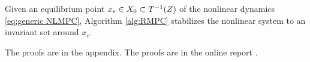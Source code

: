 
\begin{theorem}[Stability]
	\label{thm:stability}
Given an equilibrium point $x_e \in X_0 \subset T^{-1}(Z)$ of the nonlinear dynamics \eqref{eq:generic NLMPC}, Algorithm \ref{alg:RMPC} stabilizes the nonlinear system to an invariant set around $x_e$.
\end{theorem}
{
The proofs are in the appendix.
}
{
The proofs are in the online report \cite{PantAM16_RMPC}.
}